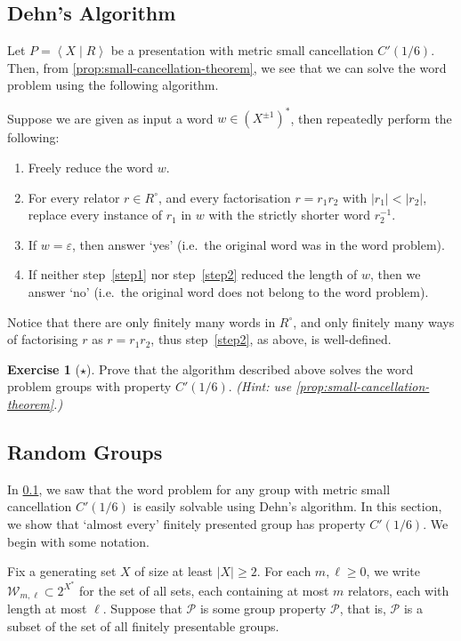 \documentclass[11pt,a4paper,reqno]{amsart}
\theoremstyle{plain}
\theoremstyle{definition}
\theoremstyle{definition}
\newtheorem{exercise}[theorem]{Exercise}
\renewcommand\geq\geqslant
\newcommand\exerciseLevelEasy{$\star$}
\begin{document}
\subsection{Dehn's Algorithm}\label{sec:dehn-algo}

Let $P = \left\langle X \mid R \right\rangle$ be a presentation with metric small cancellation $C'(1/6)$.
Then, from \cref{prop:small-cancellation-theorem}, we see that we can solve the word problem using the following algorithm.

Suppose we are given as input a word $w\in (X^{\pm 1})^*$, then repeatedly perform the following:
\begin{enumerate}
	\item\label{step1} Freely reduce the word $w$.
	\item\label{step2} For every relator $r \in R^\circ$, and every factorisation $r = r_1 r_2$ with $|r_1|< |r_2|$, replace every instance of $r_1$ in $w$ with the strictly shorter word $r_2^{-1}$.
	\item If $w = \varepsilon$, then answer `yes' (i.e.~the original word was in the word problem).
	\item If neither step~\ref{step1} nor step~\ref{step2} reduced the length of $w$, then we answer `no' (i.e.~the original word does not belong to the word problem).
\end{enumerate}
Notice that there are only finitely many words in $R^\circ$, and only finitely many ways of factorising $r$ as $r = r_1 r_2$, thus step~\ref{step2}, as above, is well-defined.

\begin{exercise}[\exerciseLevelEasy]
	Prove that the algorithm described above solves the word problem groups with property $C'(1/6)$.
	\textit{(Hint: use \cref{prop:small-cancellation-theorem}.)}
\end{exercise}

\subsection{Random Groups}

In \cref{sec:dehn-algo}, we saw that the word problem for any group with metric small cancellation $C'(1/6)$ is easily solvable using Dehn's algorithm.
In this section, we show that `almost every' finitely presented group has property $C'(1/6)$.
We begin with some notation.

Fix a generating set $X$ of size at least $|X|\geq 2$.
For each $m,\ell\geq 0$, we write $\mathcal W_{m,\ell}\subset 2^{X^*}$ for the set of all sets, each containing at most $m$ relators, each with length at most $\ell$.
Suppose that $\mathcal P$ is some group property $\mathcal P$, that is, $\mathcal P$ is a subset of the set of all finitely presentable groups.
\end{document}
